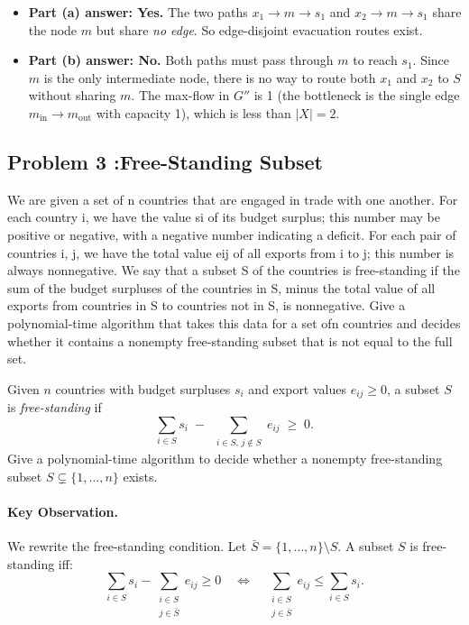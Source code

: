\documentclass[12pt,a4paper]{report}
\begin{document}
\begin{itemize}
    \item \textbf{Part (a) answer: Yes.} The two paths
    $x_1 \to m \to s_1$ and $x_2 \to m \to s_1$ share the node $m$
    but share \emph{no edge}. So edge-disjoint evacuation routes exist.
    \item \textbf{Part (b) answer: No.} Both paths must pass through $m$
    to reach $s_1$. Since $m$ is the only intermediate node, there is no
    way to route both $x_1$ and $x_2$ to $S$ without sharing $m$.
    The max-flow in $G''$ is 1 (the bottleneck is the single edge
    $m_{\mathrm{in}} \to m_{\mathrm{out}}$ with capacity 1), which is
    less than $|X| = 2$.
\end{itemize}

\subsection* {Problem 3 :Free-Standing Subset}
We are given a set of n countries that are engaged in
trade with one another. For each country i, we have the value si of its budget surplus; this
number may be positive or negative, with a negative number indicating a deficit. For each
pair of countries i, j, we have the total value eij of all exports from i to j; this number is
always nonnegative. We say that a subset S of the countries is free-standing if the sum
of the budget surpluses of the countries in S, minus the total value of all exports from
countries in S to countries not in S, is nonnegative.
Give a polynomial-time algorithm that takes this data for a set ofn countries and decides
whether it contains a nonempty free-standing subset that is not equal to the full set.


Given $n$ countries with budget surpluses $s_i$ and export values $e_{ij}
\geq 0$, a subset $S$ is \emph{free-standing} if
\[
\sum_{i \in S} s_i \;-\; \sum_{\substack{i \in S,\, j \notin S}} e_{ij}
\;\geq\; 0.
\]
Give a polynomial-time algorithm to decide whether a nonempty free-standing
subset $S \subsetneq \{1, \dots, n\}$ exists.

\paragraph{Key Observation.}
We rewrite the free-standing condition. Let $\bar{S} = \{1,\dots,n\}
\setminus S$. A subset $S$ is free-standing iff:
\[
\sum_{i \in S} s_i - \sum_{\substack{i \in S \\ j \in \bar{S}}} e_{ij}
\geq 0
\quad \Longleftrightarrow \quad
\sum_{\substack{i \in S \\ j \in \bar{S}}} e_{ij} \leq \sum_{i \in S} s_i.
\]
\end{document}
